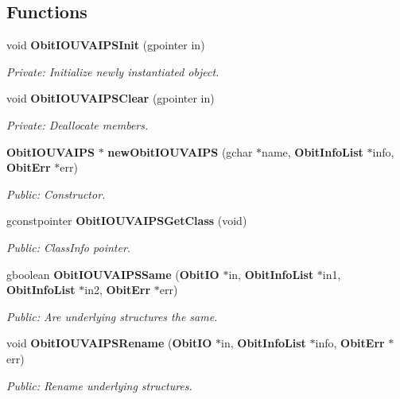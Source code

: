 \subsection*{Functions}
\begin{CompactItemize}
\item 
void {\bf Obit\-IOUVAIPSInit} (gpointer in)
\begin{CompactList}\small\item\em Private: Initialize newly instantiated object. \item\end{CompactList}\item 
void {\bf Obit\-IOUVAIPSClear} (gpointer in)
\begin{CompactList}\small\item\em Private: Deallocate members. \item\end{CompactList}\item 
{\bf Obit\-IOUVAIPS} $\ast$ {\bf new\-Obit\-IOUVAIPS} (gchar $\ast$name, {\bf Obit\-Info\-List} $\ast$info, {\bf Obit\-Err} $\ast$err)
\begin{CompactList}\small\item\em Public: Constructor. \item\end{CompactList}\item 
gconstpointer {\bf Obit\-IOUVAIPSGet\-Class} (void)
\begin{CompactList}\small\item\em Public: Class\-Info pointer. \item\end{CompactList}\item 
gboolean {\bf Obit\-IOUVAIPSSame} ({\bf Obit\-IO} $\ast$in, {\bf Obit\-Info\-List} $\ast$in1, {\bf Obit\-Info\-List} $\ast$in2, {\bf Obit\-Err} $\ast$err)
\begin{CompactList}\small\item\em Public: Are underlying structures the same. \item\end{CompactList}\item 
void {\bf Obit\-IOUVAIPSRename} ({\bf Obit\-IO} $\ast$in, {\bf Obit\-Info\-List} $\ast$info, {\bf Obit\-Err} $\ast$err)
\begin{CompactList}\small\item\em Public: Rename underlying structures. \item\end{CompactList}\item 

\end{CompactItemize}
